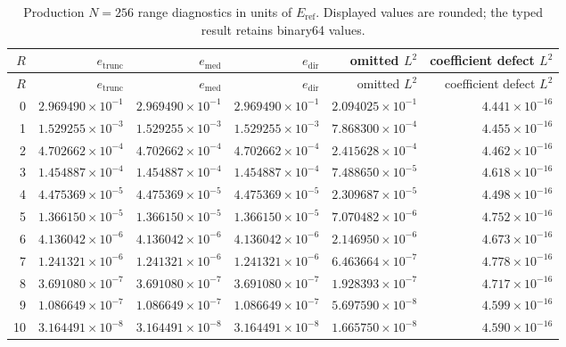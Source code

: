 \documentclass[11pt]{article}
\newcommand{\eref}{E_{\mathrm{ref}}}
\begin{document}
\begingroup
\small
\setlength{\tabcolsep}{4pt}
\begin{longtable}{r@{\quad}rrrrr}
\caption{Production $N=256$ range diagnostics in units of $\eref$.  Displayed values are
rounded; the typed result retains binary64 values.}
\label{tab:range}\\
\toprule
$R$ & $e_{\mathrm{trunc}}$ & $e_{\mathrm{med}}$ & $e_{\mathrm{dir}}$ & omitted $L^2$ & coefficient defect $L^2$ \\
\midrule
\endfirsthead
\toprule
$R$ & $e_{\mathrm{trunc}}$ & $e_{\mathrm{med}}$ & $e_{\mathrm{dir}}$ & omitted $L^2$ & coefficient defect $L^2$ \\
\midrule
\endhead
0  & $2.969490\times10^{-1}$ & $2.969490\times10^{-1}$ & $2.969490\times10^{-1}$ & $2.094025\times10^{-1}$ & $4.441\times10^{-16}$ \\
1  & $1.529255\times10^{-3}$ & $1.529255\times10^{-3}$ & $1.529255\times10^{-3}$ & $7.868300\times10^{-4}$ & $4.455\times10^{-16}$ \\
2  & $4.702662\times10^{-4}$ & $4.702662\times10^{-4}$ & $4.702662\times10^{-4}$ & $2.415628\times10^{-4}$ & $4.462\times10^{-16}$ \\
3  & $1.454887\times10^{-4}$ & $1.454887\times10^{-4}$ & $1.454887\times10^{-4}$ & $7.488650\times10^{-5}$ & $4.618\times10^{-16}$ \\
4  & $4.475369\times10^{-5}$ & $4.475369\times10^{-5}$ & $4.475369\times10^{-5}$ & $2.309687\times10^{-5}$ & $4.498\times10^{-16}$ \\
5  & $1.366150\times10^{-5}$ & $1.366150\times10^{-5}$ & $1.366150\times10^{-5}$ & $7.070482\times10^{-6}$ & $4.752\times10^{-16}$ \\
6  & $4.136042\times10^{-6}$ & $4.136042\times10^{-6}$ & $4.136042\times10^{-6}$ & $2.146950\times10^{-6}$ & $4.673\times10^{-16}$ \\
7  & $1.241321\times10^{-6}$ & $1.241321\times10^{-6}$ & $1.241321\times10^{-6}$ & $6.463664\times10^{-7}$ & $4.778\times10^{-16}$ \\
8  & $3.691080\times10^{-7}$ & $3.691080\times10^{-7}$ & $3.691080\times10^{-7}$ & $1.928393\times10^{-7}$ & $4.717\times10^{-16}$ \\
9  & $1.086649\times10^{-7}$ & $1.086649\times10^{-7}$ & $1.086649\times10^{-7}$ & $5.697590\times10^{-8}$ & $4.599\times10^{-16}$ \\
10 & $3.164491\times10^{-8}$ & $3.164491\times10^{-8}$ & $3.164491\times10^{-8}$ & $1.665750\times10^{-8}$ & $4.590\times10^{-16}$ \\

\end{longtable}
\end{document}
